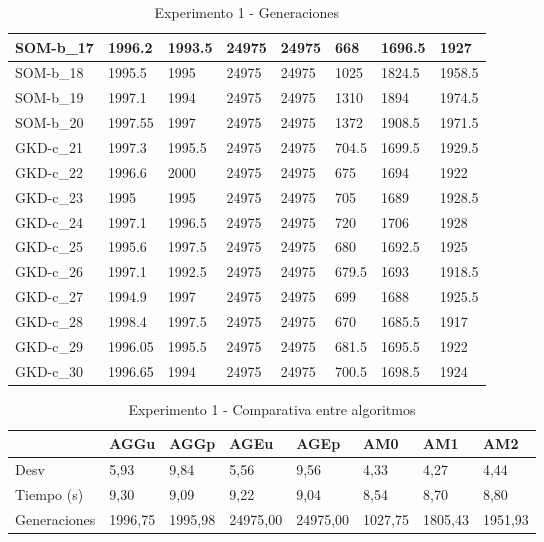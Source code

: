\documentclass[11pt,a4paper]{article}
\begin{document}
\begin{table}[H]
\begin{tabular}{l|l|l|l|l|l|l|l|}
			\multicolumn{1}{|l|}{SOM-b\_17} & 1996.2  & 1993.5 & 24975 & 24975 & 668    & 1696.5 & 1927   \\ \hline
			\multicolumn{1}{|l|}{SOM-b\_18} & 1995.5  & 1995   & 24975 & 24975 & 1025   & 1824.5 & 1958.5 \\ \hline
			\multicolumn{1}{|l|}{SOM-b\_19} & 1997.1  & 1994   & 24975 & 24975 & 1310   & 1894   & 1974.5 \\ \hline
			\multicolumn{1}{|l|}{SOM-b\_20} & 1997.55 & 1997   & 24975 & 24975 & 1372   & 1908.5 & 1971.5 \\ \hline
			\multicolumn{1}{|l|}{GKD-c\_21} & 1997.3  & 1995.5 & 24975 & 24975 & 704.5  & 1699.5 & 1929.5 \\ \hline
			\multicolumn{1}{|l|}{GKD-c\_22} & 1996.6  & 2000   & 24975 & 24975 & 675    & 1694   & 1922   \\ \hline
			\multicolumn{1}{|l|}{GKD-c\_23} & 1995    & 1995   & 24975 & 24975 & 705    & 1689   & 1928.5 \\ \hline
			\multicolumn{1}{|l|}{GKD-c\_24} & 1997.1  & 1996.5 & 24975 & 24975 & 720    & 1706   & 1928   \\ \hline
			\multicolumn{1}{|l|}{GKD-c\_25} & 1995.6  & 1997.5 & 24975 & 24975 & 680    & 1692.5 & 1925   \\ \hline
			\multicolumn{1}{|l|}{GKD-c\_26} & 1997.1  & 1992.5 & 24975 & 24975 & 679.5  & 1693   & 1918.5 \\ \hline
			\multicolumn{1}{|l|}{GKD-c\_27} & 1994.9  & 1997   & 24975 & 24975 & 699    & 1688   & 1925.5 \\ \hline
			\multicolumn{1}{|l|}{GKD-c\_28} & 1998.4  & 1997.5 & 24975 & 24975 & 670    & 1685.5 & 1917   \\ \hline
			\multicolumn{1}{|l|}{GKD-c\_29} & 1996.05 & 1995.5 & 24975 & 24975 & 681.5  & 1695.5 & 1922   \\ \hline
			\multicolumn{1}{|l|}{GKD-c\_30} & 1996.65 & 1994   & 24975 & 24975 & 700.5  & 1698.5 & 1924   \\ \hline
		\end{tabular}
		\caption{ Experimento 1 - Generaciones }
		\label{213}
	\end{table}

	\begin{table}[H]
		\begin{tabular}{l|l|l|l|l|l|l|l|}
			\cline{2-8}
			& AGGu    & AGGp    & AGEu     & AGEp     & AM0     & AM1     & AM2     \\ \hline
			\multicolumn{1}{|l|}{Desv}         & 5,93    & 9,84    & 5,56     & 9,56     & 4,33    & 4,27    & 4,44    \\ \hline
			\multicolumn{1}{|l|}{Tiempo (s)}   & 9,30    & 9,09    & 9,22     & 9,04     & 8,54    & 8,70    & 8,80    \\ \hline
			\multicolumn{1}{|l|}{Generaciones} & 1996,75 & 1995,98 & 24975,00 & 24975,00 & 1027,75 & 1805,43 & 1951,93 \\ \hline
		\end{tabular}
		\caption{ Experimento 1 - Comparativa entre algoritmos }
		\label{214}
	\end{table}
\end{document}
